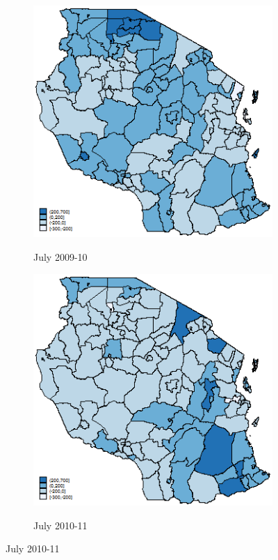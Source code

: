 \begin{figure}[h]
\caption{Deviations from mean rainfall, mm}
\centering
\begin{subfigure}[h]{0.45\textwidth}
\caption{July 2009-10}
\includegraphics[width=\textwidth,trim= 0cm 0cm 0cm 0cm, clip=true, keepaspectratio]{09_dev_district} \label{rain09}
\end{subfigure}
\begin{subfigure}[h]{0.45\textwidth}
\caption{July 2010-11}
\includegraphics[width=\textwidth,trim= 0cm 0cm 0cm 0cm, clip=true, keepaspectratio]{10_dev_district} \label{rain10}

\end{subfigure}
\end{figure}
